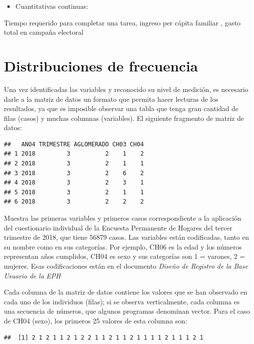\documentclass[]{book}
\providecommand{\tightlist}{%
  \setlength{\itemsep}{0pt}\setlength{\parskip}{0pt}}
\begin{document}
\begin{itemize}
\tightlist
\item
  Cuantitativas continuas:
\end{itemize}

Tiempo requerido para completar una tarea, ingreso per cápita familiar \citet{INDEC2018}, gasto total en campaña electoral \citet{MoralesQuiroga2010}

\hypertarget{distribuciones-de-frecuencia}{%
\chapter{Distribuciones de frecuencia}\label{distribuciones-de-frecuencia}}

Una vez identificadas las variables y reconocido su nivel de medición, es necesario darle a la matriz de datos un formato que permita hacer lecturas de los resultados, ya que es imposible observar una tabla que tenga gran cantidad de filas (casos) y muchas columnas (variables).
El siguiente fragmento de matriz de datos:

\begin{verbatim}
##   ANO4 TRIMESTRE AGLOMERADO CH03 CH04
## 1 2018         3          2    1    2
## 2 2018         3          2    1    1
## 3 2018         3          2    6    2
## 4 2018         3          2    3    1
## 5 2018         3          2    1    1
## 6 2018         3          2    2    2
\end{verbatim}

Muestra las primeras variables y primeros casos correspondiente a la aplicación del cuestionario individual de la Encuesta Permanente de Hogares \citet{INDEC2018} del tercer trimestre de 2018, que tiene 56879 casos. Las variables están codificadas, tanto en su nombre como en sus categorías. Por ejemplo, CH06 es la edad y los números representan años cumplidos, CH04 es sexo y sus categorías son 1 = varones, 2 = mujeres. Esas codificaciones están en el documento \emph{Diseño de Registro de la Base Usuario de la EPH} \citet{INDEC2009}

Cada columna de la matriz de datos contiene los valores que se han observado en cada uno de los individuos (filas); si se observa verticalmente, cada columna es una secuencia de números, que algunos programas denominan vector. Para el caso de CH04 (sexo), los primeros 25 valores de esta columna son:

\begin{verbatim}
##  [1] 2 1 2 1 1 2 1 2 2 1 1 2 1 1 2 1 1 1 1 2 1 1 1 2 1
\end{verbatim}
\end{document}
